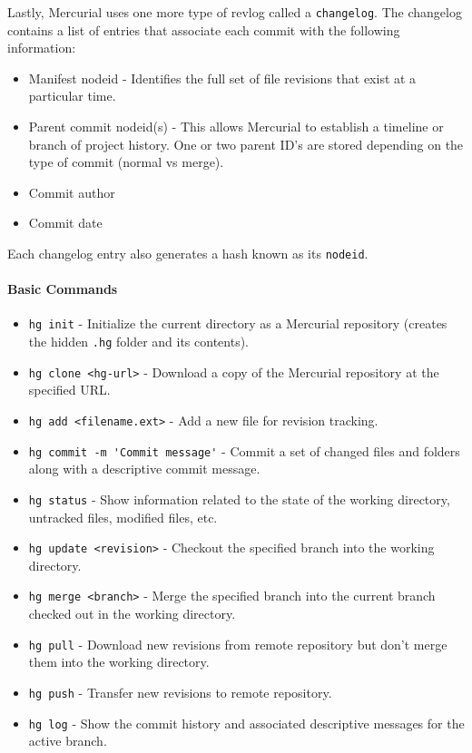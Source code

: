 Lastly, Mercurial uses one more type of revlog called a \lstinline{changelog}. The changelog contains a list of entries that associate each commit with the following information:
\begin{itemize}
    \item Manifest nodeid - Identifies the full set of file revisions that exist at a particular time.
    \item Parent commit nodeid(s) - This allows Mercurial to establish a timeline or branch of project history. One or two parent ID's are stored depending on the type of commit (normal vs merge).
    \item Commit author
    \item Commit date
\end{itemize}
Each changelog entry also generates a hash known as its \lstinline{nodeid}.

\paragraph{Basic Commands}
\begin{itemize}
    \item \lstinline{hg init} - Initialize the current directory as a Mercurial repository (creates the hidden \lstinline{.hg} folder and its contents).
    \item \lstinline{hg clone <hg-url>} - Download a copy of the Mercurial repository at the specified URL.
    \item \lstinline{hg add <filename.ext>} - Add a new file for revision tracking.
    \item \lstinline{hg commit -m 'Commit message'} - Commit a set of changed files and folders along with a descriptive commit message.
    \item \lstinline{hg status} - Show information related to the state of the working directory, untracked files, modified files, etc.
    \item \lstinline{hg update <revision>} - Checkout the specified branch into the working directory.
    \item \lstinline{hg merge <branch>} - Merge the specified branch into the current branch checked out in the working directory.
    \item \lstinline{hg pull} - Download new revisions from remote repository but don't merge them into the working directory.
    \item \lstinline{hg push} - Transfer new revisions to remote repository.
    \item \lstinline{hg log} - Show the commit history and associated descriptive messages for the active branch.
\end{itemize}

